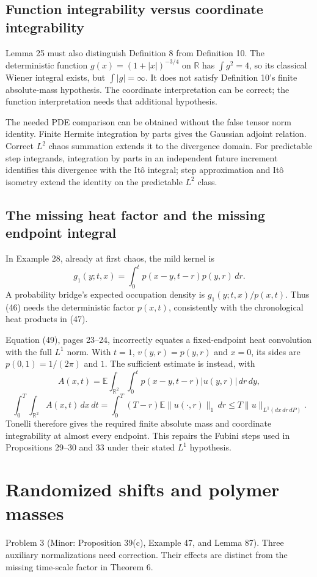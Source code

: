 \documentclass[10pt]{article}
\begin{document}
\subsection*{Function integrability versus coordinate integrability}
Lemma 25 must also distinguish Definition 8 from Definition 10. The deterministic function \(g(x)=(1+|x|)^{-3/4}\) on \(\mathbb R\) has \(\int g^2=4\), so its classical Wiener integral exists, but \(\int |g|=\infty\). It does not satisfy Definition 10’s finite absolute-mass hypothesis. The coordinate interpretation can be correct; the function interpretation needs that additional hypothesis.\par
The needed PDE comparison can be obtained without the false tensor norm identity. Finite Hermite integration by parts gives the Gaussian adjoint relation. Correct \(L^2\) chaos summation extends it to the divergence domain. For predictable step integrands, integration by parts in an independent future increment identifies this divergence with the Itô integral; step approximation and Itô isometry extend the identity on the predictable \(L^2\) class.\par
\subsection*{The missing heat factor and the missing endpoint integral}
In Example 28, already at first chaos, the mild kernel is \[g_1(y;t,x)=\int_0^t p(x-y,t-r)p(y,r)\,dr.\] A probability bridge’s expected occupation density is \(g_1(y;t,x)/p(x,t)\). Thus (46) needs the deterministic factor \(p(x,t)\), consistently with the chronological heat products in (47).\par
Equation (49), pages 23–24, incorrectly equates a fixed-endpoint heat convolution with the full \(L^1\) norm. With \(t=1\), \(v(y,r)=p(y,r)\) and \(x=0\), its sides are \(p(0,1)=1/(2\pi)\) and \(1\). The sufficient estimate is instead, with \[A(x,t)=\mathbb E\int_{\mathbb R^2}\int_0^t
 p(x-y,t-r)|u(y,r)|\,dr\,dy,\] \[\int_0^T\int_{\mathbb R^2} A(x,t)\,dx\,dt
 =\int_0^T(T-r)\mathbb E\|u(\cdot,r)\|_1\,dr
 \le T\|u\|_{L^1(dx\,dr\,dP)}.\] Tonelli therefore gives the required finite absolute mass and coordinate integrability at almost every endpoint. This repairs the Fubini steps used in Propositions 29–30 and 33 under their stated \(L^1\) hypothesis.\par
\section*{Randomized shifts and polymer masses}
Problem 3 (Minor: Proposition 39(c), Example 47, and Lemma 87).  Three auxiliary normalizations need correction. Their effects are distinct from the missing time-scale factor in Theorem 6.\par
\end{document}
